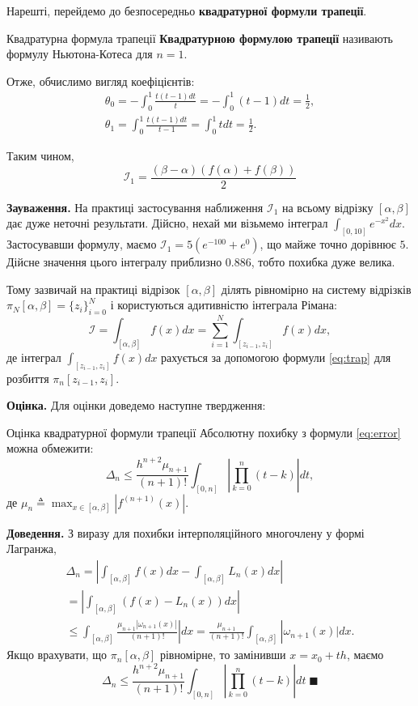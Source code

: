 \documentclass[14pt]{extarticle}
\begin{document}
Нарешті, перейдемо до безпосередньо \textbf{квадратурної формули трапеції}.

\begin{def*}{Квадратурна формула трапеції}
\textbf{Квадратурною формулою трапеції} називають формулу Ньютона-Котеса для $n=1$. 
\end{def*}
Отже, обчислимо вигляд коефіцієнтів:
\begin{gather}
    \theta_0 = -\int_0^1 \frac{t(t-1)dt}{t} = -\int_0^1 (t-1)dt = \frac{1}{2}, \\ \theta_1 = \int_0^1 \frac{t(t-1)dt}{t-1} = \int_0^1 tdt = \frac{1}{2}.
\end{gather}

Таким чином, 
\begin{equation}\label{eq:trap}
\boxed{\mathcal{I}_1 = \frac{(\beta-\alpha)(f(\alpha)+f(\beta))}{2}}
\end{equation}

\textbf{Зауваження.} На практиці застосування наближення $\mathcal{I}_1$ на всьому відрізку $[\alpha,\beta]$ дає дуже неточні результати. Дійсно, нехай ми візьмемо інтеграл $\int_{[0,10]}e^{-x^2}dx$. Застосувавши формулу, маємо $\mathcal{I}_1 = 5(e^{-100}+e^0)$, що майже точно дорівнює $5$. Дійсне значення цього інтегралу приблизно $0.886$, тобто похибка дуже велика.

Тому зазвичай на практиці відрізок $[\alpha,\beta]$ ділять рівномірно на систему відрізків $\pi_N[\alpha,\beta]=\{z_i\}_{i=0}^N$ і користуються адитивністю інтеграла Рімана:
\begin{equation}
\mathcal{I} = \int_{[\alpha,\beta]}f(x)dx = \sum_{i=1}^N \int_{[z_{i-1},z_i]}f(x)dx,
\end{equation}
де інтеграл $\int_{[z_{i-1},z_i]}f(x)dx$ рахується за допомогою формули \ref{eq:trap} для розбиття $\pi_n[z_{i-1},z_i]$.

\textbf{Оцінка.} Для оцінки доведемо наступне твердження:
\begin{statement*}{Оцінка квадратурної формули трапеції}
    Абсолютну похибку з формули \ref{eq:error} можна обмежити:
    \[
    \Delta_n \leq \frac{h^{n+2}\mu_{n+1}}{(n+1)!}\int_{[0,n]}\left|\prod_{k=0}^n (t-k)\right|dt,
    \]
    де $\mu_n \triangleq \max_{x \in [\alpha,\beta]}|f^{(n+1)}(x)|$.
\end{statement*}

\textbf{Доведення.} З виразу для похибки інтерполяційного многочлену у формі Лагранжа, 
\begin{gather}
\Delta_n=\left|\int_{[\alpha,\beta]}f(x)dx-\int_{[\alpha,\beta]}L_n(x)dx\right| \\
=\left|\int_{[\alpha,\beta]}(f(x)-L_n(x))dx\right| \\
\leq \int_{[\alpha,\beta]} \frac{\mu_{n+1}|\omega_{n+1}(x)|}{(n+1)!}|dx = \frac{\mu_{n+1}}{(n+1)!}\int_{[\alpha,\beta]}|\omega_{n+1}(x)|dx.
\end{gather}
Якщо врахувати, що $\pi_n[\alpha,\beta]$ рівномірне, то замінивши $x=x_0+th$, маємо
\begin{equation}
\Delta_n \leq \frac{h^{n+2}\mu_{n+1}}{(n+1)!}\int_{[0,n]} \left|\prod_{k=0}^n (t-k)\right|dt \; \blacksquare
\end{equation}
\end{document}
